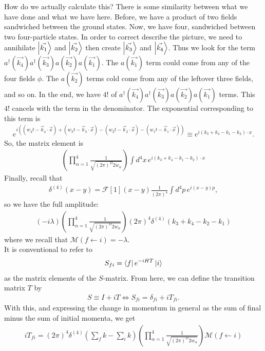 \documentclass{book}
\theoremstyle{definition}
\newcommand{\F}{\mathcal{F}}
\newcommand{\f}[2]{\frac{#1}{#2}}
\newcommand{\lp}{\left(}
\newcommand{\rp}{\right)}
\begin{document}
  
How do we actually calculate this? There is some similarity between what we have done and what we have here. Before, we have a product of two fields sandwiched between the ground states. Now, we have four, sandwiched between two four-particle states. In order to correct describe the picture, we need to annihilate $\ket{\vec{k_1}}$ and $\ket{\vec{k_2}}$ then create $\ket{\vec{k_3}}$ and $\ket{\vec{k_4}}$. Thus we look for the term $a^\dagger(\vec{k_4}) a^\dagger(\vec{k_3})a(\vec{k_2})a(\vec{k_1})$. The $a(\vec{k_1})$ term could come from any of the four fields $\phi$. The $a(\vec{k_2})$ terms cold come from any of the leftover three fields, and so on. In the end, we have $4!$ of $a^\dagger(\vec{k_4}) a^\dagger(\vec{k_3})a(\vec{k_2})a(\vec{k_1})$ terms. This $4!$ cancels with the term in the denominator. The exponential corresponding to this term is 
\begin{align}
e^{ i \lp (w_4 t - \vec{k}_4 \cdot \vec{x}) + (w_3 t - \vec{k}_3 \cdot \vec{x}) - (w_2 t - \vec{k}_2 \cdot \vec{x}) - (w_1 t - \vec{k}_1 \cdot \vec{x})\rp } \equiv e^{i (k_3 + k_4 - k_1 - k_2)\cdot x}.
\end{align}
So, the matrix element is 
\begin{align}
\lp \prod^4_{\alpha = 1} \f{1}{\sqrt{(2\pi)^D 2 w_\alpha}} \rp \int d^4x\, e^{i (k_3 + k_4 - k_1 - k_2)\cdot x} 
\end{align}
Finally, recall that
\begin{align}
\delta^{(4)}(x - y) = \F[1](x-y) \f{1}{(2\pi)^4}\int d^4p \, e^{i(x-y)p},
\end{align}
so we have the full amplitude: 
\begin{align}
\boxed{\lp -i\lambda \rp \lp \prod^4_{\alpha = 1} \f{1}{\sqrt{(2\pi)^D 2 w_\alpha}} \rp (2\pi)^4 \delta^{(4)}(k_3 + k_4 - k_2 - k_1)}
\end{align}
where we recall that $\mathcal{M}(f \leftarrow i) = -\lambda$.\\

It is conventional to refer to 
\begin{align}
S_{fi} = \bra{f}e^{-iHT}\ket{i}
\end{align}
as the matrix elements of the $S$-matrix. From here, we can define the transition matrix $T$ by 
\begin{align}
S \equiv I + iT \iff S_{fi} = \delta_{fi} + iT_{fi}.
\end{align}
With this, and expressing the change in momentum in general as the sum of final minus the sum of initial momenta, we get
\begin{align}
\boxed{iT_{fi} = (2\pi)^4 \delta^{(4)}\lp \sum_f k - \sum_i k \rp \lp \prod^4_{\alpha = 1} \f{1}{\sqrt{(2\pi)^D 2 w_\alpha}} \rp \mathcal{M}(f \leftarrow i)}
\end{align}
\end{document}

